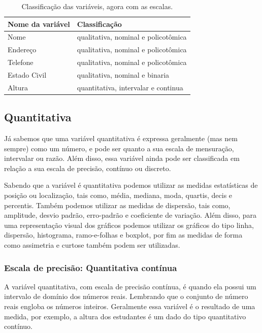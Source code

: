 \documentclass[a4paper,12pt]{book}
\begin{document}
\begin{table}
	\centering
	\caption{Classificação das variáveis, agora com as escalas.}
	\begin{tabular}{|l|l|}
		\hline
		\textbf{Nome da variável} &\textbf{Classificação} \\
		\hline
		Nome & qualitativa, nominal e policotômica  \\
		\hline
		Endereço & qualitativa, nominal e policotômica  \\
		\hline
		Telefone & qualitativa, nominal e policotômica \\
		\hline
		Estado Civil & qualitativa, nominal e binaria \\
		\hline
		Altura & quantitativa, intervalar e continua \\
		\hline
	\end{tabular}
	\label{tbl:clienteclassificacaoescala}
\end{table}

\subsection{Quantitativa}

Já sabemos que uma variável quantitativa é expressa geralmente (mas nem sempre) como um número, e pode ser quanto a sua escala de mensuração, intervalar ou razão. Além disso, essa variável ainda pode ser classificada em relação a sua escala de precisão, contínuo ou discreto.

Sabendo que a variável é quantitativa podemos utilizar as medidas estatísticas de posição ou localização, tais como, média, mediana, moda, quartis, decis e percentis. Também podemos utilizar as medidas de dispersão, tais como, amplitude, desvio padrão, erro-padrão e coeficiente de variação. Além disso, para uma representação visual dos gráficos podemos utilizar os gráficos do tipo linha, dispersão, histograma, ramo-e-folhas e boxplot, por fim as medidas de forma como assimetria e curtose também podem ser utilizadas\cite{favero2017manual}.

\subsubsection{Escala de precisão: Quantitativa contínua}

A  variável quantitativa, com escala de precisão contínua, é quando ela possui um intervalo de domínio dos números reais. Lembrando que o conjunto de número reais engloba os números inteiros. Geralmente essa variável é o resultado de uma medida, por exemplo, a altura dos estudantes é um dado do tipo quantitativo contínuo.
\end{document}
